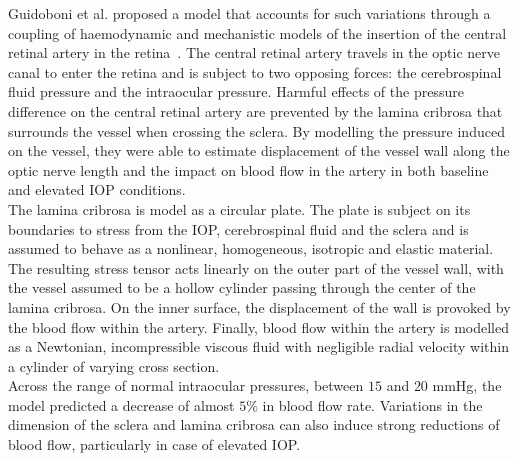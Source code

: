 \documentclass[12pt,a4paper]{article}
\begin{document}
Guidoboni et al. proposed a model that accounts for such variations through a coupling of haemodynamic and mechanistic models of the insertion of the central retinal artery in the retina~\cite{Guidoboni_2014}.
The central retinal artery travels in the optic nerve canal to enter the retina and is subject to two opposing forces: the cerebrospinal fluid pressure and the intraocular pressure.
Harmful effects of the pressure difference on the central retinal artery are prevented by the lamina cribrosa that surrounds the vessel when crossing the sclera.
By modelling the pressure induced on the vessel, they were able to estimate displacement of the vessel wall along the optic nerve length and the impact on blood flow in the artery in both baseline and elevated IOP conditions.\\
The lamina cribrosa is model as a circular plate.
The plate is subject on its boundaries to stress from the IOP, cerebrospinal fluid and the sclera and is assumed to behave as a nonlinear, homogeneous, isotropic and elastic material.
The resulting stress tensor acts linearly on the outer part of the vessel wall, with the vessel assumed to be a hollow cylinder passing through the center of the lamina cribrosa.
On the inner surface, the displacement of the wall is provoked by the blood flow within the artery.
Finally, blood flow within the artery is modelled as a Newtonian, incompressible viscous fluid with negligible radial velocity within a cylinder of varying cross section.\\
Across the range of normal intraocular pressures, between $15$ and $20$ mmHg, the model predicted a decrease of almost $5\%$ in blood flow rate.
Variations in the dimension of the sclera and lamina cribrosa can also induce strong reductions of blood flow, particularly in case of elevated IOP. \\
\end{document}
